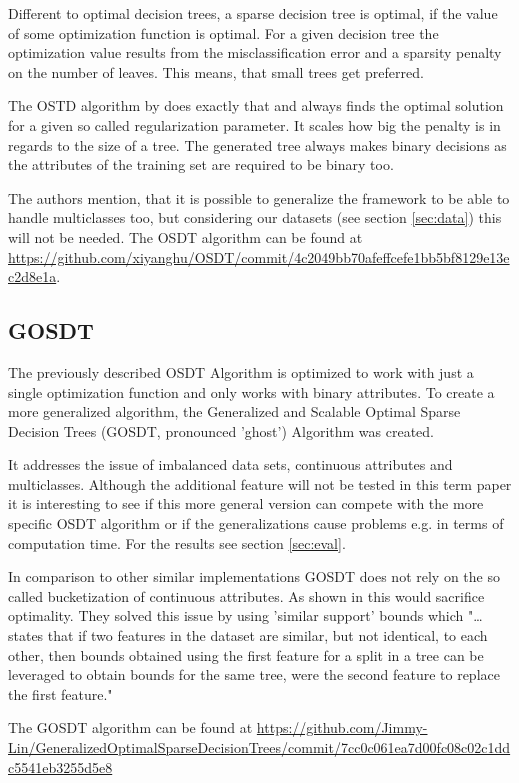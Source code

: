 \documentclass[a4paper,preprint]{sig-alternate-xt}
\begin{document}
Different to optimal decision trees, a sparse decision tree is optimal, if the value of some optimization function is optimal. For a given decision tree the optimization value results from the misclassification error and a sparsity penalty on the number of leaves. This means, that small trees get preferred.

The OSTD algorithm by \citet{OSDT} does exactly that and always finds the optimal solution for a given so called regularization parameter. It scales how big the penalty is in regards to the size of a tree. The generated tree always makes binary decisions as the attributes of the training set are required to be binary too.

The authors mention, that it is possible to generalize the framework to be able to handle multiclasses too, but considering our datasets (see section \ref{sec:data}) this will not be needed. The OSDT algorithm can be found at \url{https://github.com/xiyanghu/OSDT/commit/4c2049bb70afeffcefe1bb5bf8129e13ec2d8e1a}.

\subsection{GOSDT}
\label{subsec:gosdt}
The previously described OSDT Algorithm is optimized to work with just a single optimization function and only works with binary attributes.
To create a more generalized algorithm, the Generalized and Scalable Optimal Sparse Decision Trees (GOSDT, pronounced 'ghost') Algorithm was created.

It addresses the issue of imbalanced data sets, continuous attributes and multiclasses. Although the additional feature will not be tested in this term paper it is interesting to see if this more general version can compete with the more specific OSDT algorithm or if the generalizations cause problems e.g. in terms of computation time. For the results see section \ref{sec:eval}.

In comparison to other similar implementations GOSDT does not rely on the so called bucketization of continuous attributes. As shown in \cite{GOSDT} this would sacrifice optimality. They solved this issue by using 'similar support'
bounds which "\dots states that if
two features in the dataset are similar, but not identical,
to each other, then bounds obtained using the first feature
for a split in a tree can be leveraged to obtain bounds for
the same tree, were the second feature to replace the first
feature." \cite{GOSDT}

The GOSDT algorithm can be found at \url{https://github.com/Jimmy-Lin/GeneralizedOptimalSparseDecisionTrees/commit/7cc0c061ea7d00fc08c02c1ddc5541eb3255d5e8}
\end{document}
